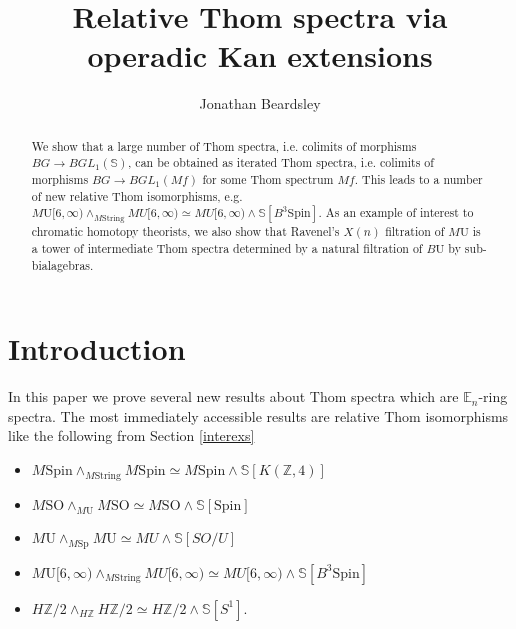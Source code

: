\documentclass{article}
\title{Relative Thom spectra via operadic Kan extensions}
\author{Jonathan Beardsley}
\theoremstyle{definition}
\theoremstyle{plain}
\newcommand{\ints}{\mathbb{Z}}
\newcommand{\sph}{\mathbb{S}}
\newcommand{\E}{\mathbb{E}}
\newcommand{\MString}{M\mathrm{String}}
\newcommand{\MSpin}{M\mathrm{Spin}}
\newcommand{\MU}{M\mathrm{U}}
\newcommand{\BU}{B\mathrm{U}}
\newcommand{\MSO}{M\mathrm{SO}}
\newcommand{\MSp}{M\mathrm{Sp}}
\newcommand{\Spin}{\mathrm{Spin}}
\begin{document}
\maketitle

\begin{abstract}
We show that a large number of Thom spectra, i.e. colimits of morphisms $BG\to BGL_1(\sph)$, can be obtained as iterated Thom spectra, i.e. colimits of morphisms $BG\to BGL_1(Mf)$ for some Thom spectrum $Mf$. This leads to a number of new relative Thom isomorphisms, e.g. $\MU[6,\infty)\wedge_{\MString} MU[6,\infty)\simeq MU[6,\infty)\wedge\sph[B^3\Spin]$. As an example of interest to chromatic homotopy theorists, we also show that Ravenel's $X(n)$ filtration of $\MU$ is a tower of intermediate Thom spectra determined by a natural filtration of $\BU$ by sub-bialagebras. 
\end{abstract}



\section{Introduction}
In this paper we prove several new results about Thom spectra which are $\E_n$-ring spectra. The most immediately accessible results are relative Thom isomorphisms like the following from Section \ref{interexs}

\begin{itemize}
\item $\MSpin\wedge_{\MString}\MSpin\simeq \MSpin\wedge\sph[K(\ints,4)]$
\item $\MSO\wedge_{\MU}\MSO\simeq \MSO\wedge \sph[\Spin]$ 
\item $\MU\wedge_{\MSp}\MU\simeq MU\wedge\sph[SO/U]$
\item $\MU[6,\infty)\wedge_{\MString} MU[6,\infty)\simeq MU[6,\infty)\wedge\sph[B^3\Spin]$
\item $H\ints/2\wedge_{H\ints}H\ints/2\simeq H\ints/2\wedge\sph[S^1]$.
\end{itemize}
\end{document}

